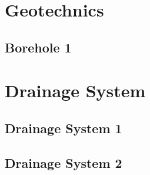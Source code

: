 \documentclass{scrartcl}
\begin{document}
\section{Geotechnics}

\subsection{Borehole 1}
\label{sec:borehole_1}
\clearpage

\section{Drainage System}

\subsection{Drainage System 1}
\label{sec:drainage_1}
\clearpage

\subsection{Drainage System 2}
\label{sec:drainage_2}
\clearpage
\end{document}
